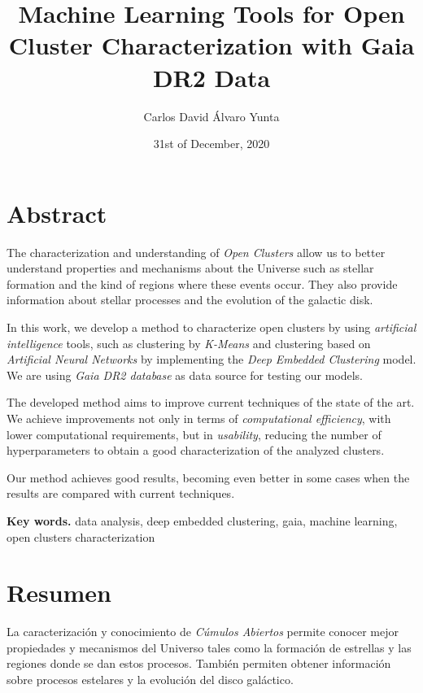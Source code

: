 \documentclass[11pt, a4paper, english]{book}
\title{Machine Learning Tools for Open Cluster Characterization with Gaia DR2 Data}
\author{Carlos David Álvaro Yunta}
\date{31st of December, 2020}
\begin{document}

\maketitle

\frontmatter
\tableofcontents

\listoffigures
\listoftables

\chapter{Abstract}

The characterization and understanding of \emph{Open Clusters} allow us to better understand properties and mechanisms about the Universe
such as stellar formation and the kind of regions where these events occur.
They also provide information about stellar processes and the evolution of the galactic disk.

In this work, we develop a method to characterize open clusters by using \emph{artificial intelligence} tools,
such as clustering by \emph{K-Means} and clustering based on \emph{Artificial Neural Networks} by implementing the \emph{Deep Embedded Clustering} model.
We are using \emph{Gaia DR2 database} as data source for testing our models.

The developed method aims to improve current techniques of the state of the art.
We achieve improvements not only in terms of \emph{computational efficiency}, with lower computational requirements, but in \emph{usability},
reducing the number of hyperparameters to obtain a good characterization of the analyzed clusters.

Our method achieves good results, becoming even better in some cases when the results are compared with current techniques.

\medskip

{\bf Key words.} data analysis, deep embedded clustering, gaia, machine learning, open clusters characterization

\chapter{Resumen}

La caracterización y conocimiento de \emph{Cúmulos Abiertos} permite conocer mejor propiedades y mecanismos del Universo tales como
la formación de estrellas y las regiones donde se dan estos procesos.
También permiten obtener información sobre procesos estelares y la evolución del disco galáctico.
\end{document}
